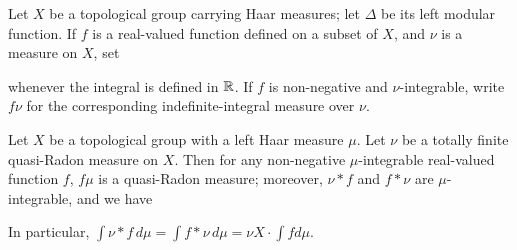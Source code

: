 Let $X$ be a topological group carrying Haar measures;  let $\Delta$ be
its left modular function.   If $f$ is a real-valued
function defined on a subset of $X$, and $\nu$ is a measure on $X$, set


\noindent whenever the integral is defined in $\Bbb R$.
   If $f$ is
non-negative and $\nu$-integrable, write $f\nu$ for the corresponding
indefinite-integral measure over $\nu$.

 Let $X$ be a topological group with a left
Haar measure $\mu$.   Let $\nu$ be a totally finite
quasi-Radon measure on $X$.   Then for any non-negative $\mu$-integrable
real-valued function $f$, $f\mu$ is a quasi-Radon measure;  moreover,
$\nu*f$ and $f*\nu$ are $\mu$-integrable, and we have


\noindent In particular,
$\int\nu*f\,d\mu=\int f*\nu\,d\mu=\nu X\cdot\int fd\mu$.

